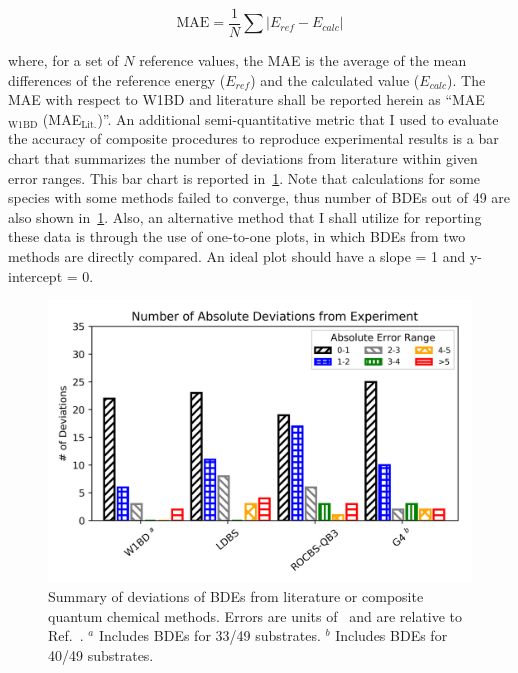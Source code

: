 \begin{doublespace}
\begin{equation}
  \mathrm{MAE} = \frac{1}{N} \sum | E_{ref} - E_{calc}|
\end{equation}

\noindent where, for a set of $N$ reference values, the MAE is the average of
the mean differences of the reference energy ($E_{ref}$) and the calculated
value ($E_{calc}$). The MAE with respect to W1BD and literature shall be
reported herein as ``MAE$_{\mathrm{W1BD}}$ (MAE$_{\mathrm{Lit.}}$)''. An
additional semi-quantitative metric that I used to evaluate the accuracy of
composite procedures to reproduce experimental results is a bar chart that
summarizes the number of deviations from literature within given error ranges.
This bar chart is reported in~\ref{fig:maebarchart}. Note that calculations for
some species with some methods failed to converge, thus number of BDEs out of
49 are also shown in~\ref{fig:maebarchart}. Also, an alternative method that I
shall utilize for reporting these data is through the use of one-to-one plots,
in which BDEs from two methods are directly compared. An ideal plot should have
a slope = 1 and y-intercept = 0.

\begin{figure}[!htbp]
  \centering
  \includegraphics[width=\textwidth]{figures/bde-barchart}
  \caption[Summary of deviations of BDEs from literature for composite quantum
  chemical methods.]{Summary of deviations of BDEs from literature or composite
  quantum chemical methods. Errors are units of \kcalmol\ and are relative to
  Ref.~\protect{}. $^a$ Includes BDEs for 33/49 substrates. $^b$
  Includes BDEs for 40/49 substrates.} \label{fig:maebarchart}
\end{figure}


\end{doublespace}

